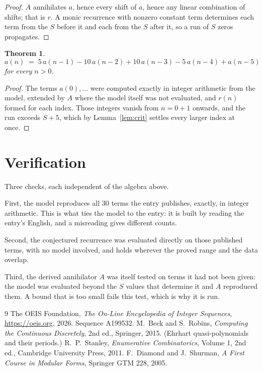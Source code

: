 \documentclass[11pt,a4paper]{article}
\theoremstyle{plain}
\newtheorem{theorem}{Theorem}
\theoremstyle{definition}
\begin{document}
\begin{proof}
$A$ annihilates $a$, hence every shift of $a$, hence any linear combination of shifts; that is
$r$. A monic recurrence with nonzero constant term determines each term from the $S$ before it
and each from the $S$ after it, so a run of $S$ zeros propagates.
\end{proof}

\begin{theorem}
\[
a(n)\;=\;5\,a(n-1) - 10\,a(n-2) + 10\,a(n-3) - 5\,a(n-4) + a(n-5)
\]
for every $n>0$.
\end{theorem}

\begin{proof}
The terms $a(0),\dots$ were computed exactly in integer arithmetic from the model, extended by
$A$ where the model itself was not evaluated, and $r(n)$ formed for each index. Those integers
vanish from $n=0+1$ onwards, and the run exceeds $S+5$, which by
Lemma~\ref{lem:crit} settles every larger index at once.
\end{proof}

\section{Verification}

Three checks, each independent of the algebra above.

First, the model reproduces all $30$ terms the entry publishes, exactly, in integer
arithmetic. This is what ties the model to the entry: it is built by reading the entry's
English, and a misreading gives different counts.

Second, the conjectured recurrence was evaluated directly on those published terms, with no
model involved, and holds wherever the proved range and the data overlap.

Third, the derived annihilator $A$ was itself tested on terms it had not been given: the model
was evaluated beyond the $S$ values that determine it and $A$ reproduced them. A bound that is
too small fails this test, which is why it is run.

\begin{thebibliography}{9}
 The OEIS Foundation, \emph{The On-Line Encyclopedia of Integer
Sequences}, \url{https://oeis.org}, 2026. Sequence A199532.
 M.~Beck and S.~Robins, \emph{Computing the Continuous Discretely},
2nd ed., Springer, 2015. (Ehrhart quasi-polynomials and their periods.)
 R.~P.~Stanley, \emph{Enumerative Combinatorics}, Volume 1, 2nd ed.,
Cambridge University Press, 2011.
 F.~Diamond and J.~Shurman, \emph{A First Course in Modular Forms},
Springer GTM 228, 2005.
\end{thebibliography}
\end{document}
